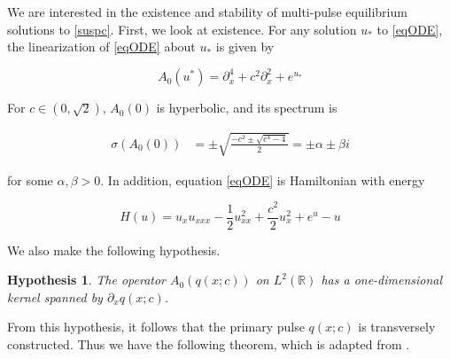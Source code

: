 \documentclass[12pt]{article}
\def\R{{\mathbb R}}
\newtheorem{hypothesis}{Hypothesis}
\begin{document}
We are interested in the existence and stability of multi-pulse equilibrium solutions to \eqref{suspc}. First, we look at existence. For any solution $u_*$ to \eqref{eqODE}, the linearization of \eqref{eqODE} about $u_*$ is given by

\begin{equation}\label{defA0}
A_0(u^*) = \partial_x^4 + c^2 \partial_x^2 + e^{u_*}
\end{equation}

For $c \in (0, \sqrt{2})$, $A_0(0)$ is hyperbolic, and its spectrum is

\begin{align}\label{specA00}
\sigma(A_0(0)) &= \pm \sqrt{\frac{-c^2 \pm \sqrt{c^4 - 4}}{2} } = \pm \alpha \pm \beta i
\end{align}

for some $\alpha, \beta > 0$. In addition, equation \eqref{eqODE} is Hamiltonian with energy

\begin{equation}\label{defH}
H(u) = u_x u_{xxx} - \frac{1}{2}u_{xx}^2 + \frac{c^2}{2}u_x^2 + e^u - u
\end{equation}

We also make the following hypothesis.

\begin{hypothesis}\label{A0kernel}
The operator $A_0(q(x; c))$ on $L^2(\R)$ has a one-dimensional kernel spanned by $\partial_x q(x; c)$.
\end{hypothesis}

From this hypothesis, it follows that the primary pulse $q(x; c)$ is transversely constructed. Thus we have the following theorem, which is adapted from \cite[Theorem 3.6]{Sandstede1997}.
\end{document}
